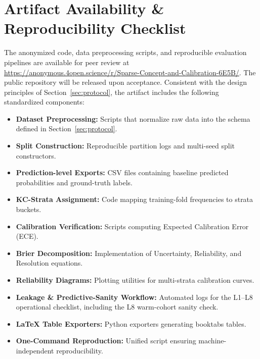 \documentclass[12pt,a4paper]{jedm}
\begin{document}







\section*{Artifact Availability \& Reproducibility Checklist}
\begin{sloppypar}
The anonymized code, data preprocessing scripts, and reproducible evaluation pipelines are available for peer review at \url{https://anonymous.4open.science/r/Sparse-Concept-and-Calibration-6E5B/}. The public repository will be released upon acceptance. Consistent with the design principles of Section~\ref{sec:protocol}, the artifact includes the following standardized components:
\end{sloppypar}
\begin{itemize}
  \item \textbf{Dataset Preprocessing:} Scripts that normalize raw data into the schema defined in Section~\ref{sec:protocol}.
  \item \textbf{Split Construction:} Reproducible partition logs and multi-seed split constructors.
  \item \textbf{Prediction-level Exports:} CSV files containing baseline predicted probabilities and ground-truth labels.
  \item \textbf{KC-Strata Assignment:} Code mapping training-fold frequencies to strata buckets.
  \item \textbf{Calibration Verification:} Scripts computing Expected Calibration Error (ECE).
  \item \textbf{Brier Decomposition:} Implementation of Uncertainty, Reliability, and Resolution equations.
  \item \textbf{Reliability Diagrams:} Plotting utilities for multi-strata calibration curves.
  \item \textbf{Leakage \& Predictive-Sanity Workflow:} Automated logs for the L1--L8 operational checklist, including the L8 warm-cohort sanity check.
  \item \textbf{LaTeX Table Exporters:} Python exporters generating booktabs tables.
  \item \textbf{One-Command Reproduction:} Unified script ensuring machine-independent reproducibility.
\end{itemize}

\appendix

\end{document}
